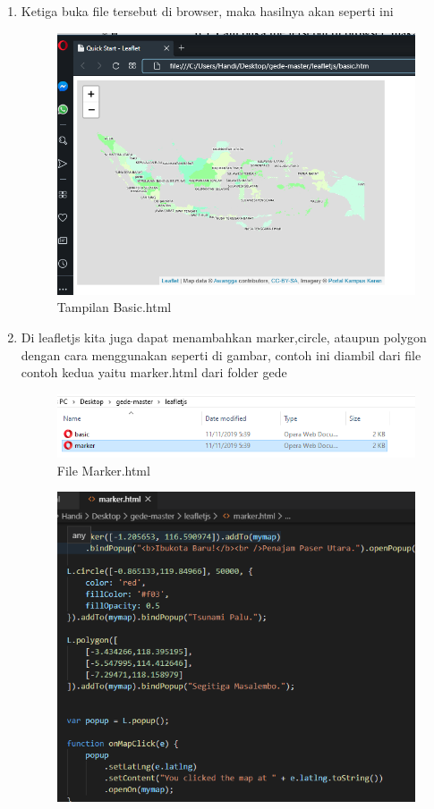 \begin{enumerate}
    \item Ketiga buka file tersebut di browser, maka hasilnya akan seperti ini
    \hfill\break
    \begin{figure}[H]
		\includegraphics[width=12cm]{figures/Tugas5/1174080/4.png}
		\centering
		\caption{Tampilan Basic.html}
	\end{figure}
    \item Di leafletjs kita juga dapat menambahkan marker,circle, ataupun polygon dengan cara menggunakan seperti di gambar, contoh ini diambil dari file contoh kedua yaitu marker.html dari folder gede 
    \hfill\break
    \begin{figure}[H]
		\includegraphics[width=12cm]{figures/Tugas5/1174080/5.png}
		\centering
		\caption{File Marker.html}
	\end{figure}
	\begin{figure}[H]
		\includegraphics[width=12cm]{figures/Tugas5/1174080/6.png}

\end{figure}
\end{enumerate}
